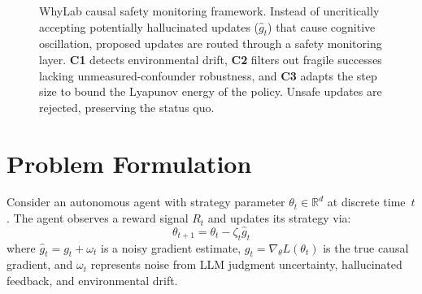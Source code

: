 \documentclass{article}
\begin{document}
\begin{figure}[t]
{
  }
  \vspace{0.5em}
  \caption{WhyLab causal safety monitoring framework. Instead of uncritically accepting potentially
  hallucinated updates ($\hat{g}_t$) that cause cognitive oscillation, proposed updates are routed
  through a safety monitoring layer. \textbf{C1} detects environmental drift, \textbf{C2} filters out
  fragile successes lacking unmeasured-confounder robustness, and \textbf{C3} adapts the step size
  to bound the Lyapunov energy of the policy. Unsafe updates are rejected, preserving the status quo.}
  \label{fig:framework}
\end{figure}

\section{Problem Formulation}
\label{sec:problem}


Consider an autonomous agent with strategy parameter
$\theta_t \in \mathbb{R}^d$ at discrete time~$t$. The agent observes
a reward signal $R_t$ and updates its strategy via:
\begin{equation}
  \theta_{t+1} = \theta_t - \zeta_t \hat{g}_t
  \label{eq:update}
\end{equation}
where $\hat{g}_t = g_t + \omega_t$ is a noisy gradient estimate,
$g_t = \nabla_\theta L(\theta_t)$ is the true causal gradient, and
$\omega_t$ represents noise from LLM judgment uncertainty, hallucinated
feedback, and environmental drift.
\end{document}
